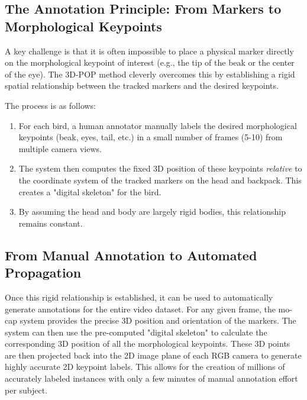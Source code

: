 \subsection{The Annotation Principle: From Markers to Morphological Keypoints}
A key challenge is that it is often impossible to place a physical marker directly on the morphological keypoint of interest (e.g., the tip of the beak or the center of the eye). The 3D-POP method cleverly overcomes this by establishing a rigid spatial relationship between the tracked markers and the desired keypoints.

The process is as follows:
\begin{enumerate}
    \item For each bird, a human annotator manually labels the desired morphological keypoints (beak, eyes, tail, etc.) in a small number of frames (5-10) from multiple camera views.
    \item The system then computes the fixed 3D position of these keypoints \textit{relative} to the coordinate system of the tracked markers on the head and backpack. This creates a "digital skeleton" for the bird.
    \item By assuming the head and body are largely rigid bodies, this relationship remains constant.
\end{enumerate}

\subsection{From Manual Annotation to Automated Propagation}
Once this rigid relationship is established, it can be used to automatically generate annotations for the entire video dataset. For any given frame, the mo-cap system provides the precise 3D position and orientation of the markers. The system can then use the pre-computed "digital skeleton" to calculate the corresponding 3D position of all the morphological keypoints. These 3D points are then projected back into the 2D image plane of each RGB camera to generate highly accurate 2D keypoint labels. This allows for the creation of millions of accurately labeled instances with only a few minutes of manual annotation effort per subject.

